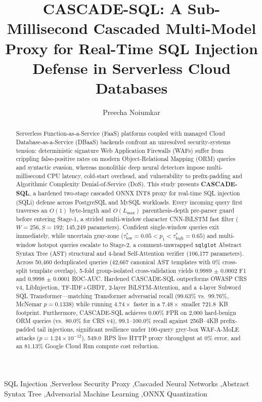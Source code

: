 \documentclass[preprint,12pt]{elsarticle}
\begin{document}
\begin{frontmatter}

\title{CASCADE-SQL: A Sub-Millisecond Cascaded Multi-Model Proxy for Real-Time SQL Injection Defense in Serverless Cloud Databases}

\author[msu]{Preecha Noiumkar}

\begin{abstract}
Serverless Function-as-a-Service (FaaS) platforms coupled with managed Cloud Database-as-a-Service (DBaaS) backends confront an unresolved security-systems tension: deterministic signature Web Application Firewalls (WAFs) suffer from crippling false-positive rates on modern Object-Relational Mapping (ORM) queries and syntactic evasion, whereas monolithic deep neural detectors impose multi-millisecond CPU latency, cold-start overhead, and vulnerability to prefix-padding and Algorithmic Complexity Denial-of-Service (DoS). This study presents \textbf{CASCADE-SQL}, a hardened two-stage cascaded ONNX INT8 proxy for real-time SQL injection (SQLi) defense across PostgreSQL and MySQL workloads. Every incoming query first traverses an $O(1)$ byte-length and $O(L_{\max})$ parenthesis-depth pre-parser guard before entering Stage-1, a strided multi-window character CNN-BiLSTM fast filter ($W=256, S=192$; 145,249 parameters). Confident single-window queries exit immediately, while uncertain gray-zone ($\tau_{\text{low}}^*=0.05 < p_1 < \tau_{\text{high}}^*=0.65$) and multi-window hotspot queries escalate to Stage-2, a comment-unwrapped \texttt{sqlglot} Abstract Syntax Tree (AST) structural and 4-head Self-Attention verifier (106,177 parameters). Across 50,460 deduplicated queries (42,667 canonical AST templates with 0\% cross-split template overlap), 5-fold group-isolated cross-validation yields 0.9989 $\pm$ 0.0002 F1 and 0.9998 $\pm$ 0.0001 ROC-AUC. Hardened CASCADE-SQL outperforms OWASP CRS v4, LibInjection, TF-IDF+GBDT, 2-layer BiLSTM-Attention, and a 4-layer Subword SQL Transformer—matching Transformer adversarial recall (99.63\% vs.\ 99.76\%, McNemar $p=0.1338$) while running $4.74\times$ faster in a $7.48\times$ smaller 721.8~KB footprint. Furthermore, CASCADE-SQL achieves 0.00\% FPR on 2,000 hard-benign ORM queries (vs.\ 80.0\% for CRS v4), 99.1--100.0\% recall against 256B--4KB prefix-padded tail injections, significant resilience under 100-query grey-box WAF-A-MoLE attacks ($p=1.24\times 10^{-12}$), 549.0~RPS live HTTP proxy throughput at 0\% error, and an 81.13\% Google Cloud Run compute cost reduction.
\end{abstract}

\begin{keyword}
SQL Injection \sep Serverless Security Proxy \sep Cascaded Neural Networks \sep Abstract Syntax Tree \sep Adversarial Machine Learning \sep ONNX Quantization
\end{keyword}

\end{frontmatter}
\end{document}
